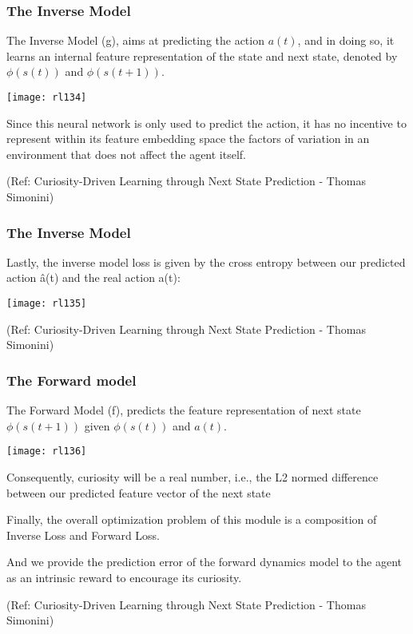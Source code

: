 \begin{frame}[fragile]\frametitle{The Inverse Model}

The Inverse Model (g), aims at predicting the action $a(t)$, and in doing so, it learns an internal feature representation of the state and next state, denoted by $\phi(s(t))$ and $\phi(s(t+1))$.
\begin{center}
\texttt{[image: rl134]}
\end{center}

Since this neural network is only used to predict the action, it has no incentive to represent within its feature embedding space the factors of variation in an environment that does not affect the agent itself.


{\tiny (Ref: Curiosity-Driven Learning through Next State Prediction - Thomas Simonini)}


\end{frame}

\begin{frame}[fragile]\frametitle{The Inverse Model}

Lastly, the inverse model loss is given by the cross entropy between our predicted action â(t) and the real action a(t):


\begin{center}
\texttt{[image: rl135]}
\end{center}



{\tiny (Ref: Curiosity-Driven Learning through Next State Prediction - Thomas Simonini)}


\end{frame}

\begin{frame}[fragile]\frametitle{The Forward model}

The Forward Model (f), predicts the feature representation of next state $\phi(s(t+1))$ given $\phi(s(t))$ and $a(t)$.

\begin{center}
\texttt{[image: rl136]}
\end{center}

Consequently, curiosity will be a real number, i.e., the L2 normed difference between our predicted feature vector of the next state

Finally, the overall optimization problem of this module is a composition of Inverse Loss and Forward Loss.

And we provide the prediction error of the forward dynamics model to the agent as an intrinsic reward to encourage its curiosity.

{\tiny (Ref: Curiosity-Driven Learning through Next State Prediction - Thomas Simonini)}


\end{frame}


